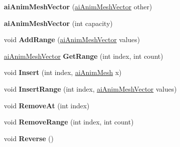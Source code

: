 \begin{DoxyCompactItemize}
\item 
\hypertarget{classai_anim_mesh_vector_a2f81b99181a5c1469b086d97b07157bb}{{\bfseries ai\+Anim\+Mesh\+Vector} (\hyperlink{classai_anim_mesh_vector}{ai\+Anim\+Mesh\+Vector} other)}\label{classai_anim_mesh_vector_a2f81b99181a5c1469b086d97b07157bb}

\item 
\hypertarget{classai_anim_mesh_vector_ad7437909a67f6fd1daba45ce2792d29b}{{\bfseries ai\+Anim\+Mesh\+Vector} (int capacity)}\label{classai_anim_mesh_vector_ad7437909a67f6fd1daba45ce2792d29b}

\item 
\hypertarget{classai_anim_mesh_vector_a24bf5932e8a6d019c3e59d7251af1abb}{void {\bfseries Add\+Range} (\hyperlink{classai_anim_mesh_vector}{ai\+Anim\+Mesh\+Vector} values)}\label{classai_anim_mesh_vector_a24bf5932e8a6d019c3e59d7251af1abb}

\item 
\hypertarget{classai_anim_mesh_vector_aa5515c3028c415d106d14c1f8a2b8ae2}{\hyperlink{classai_anim_mesh_vector}{ai\+Anim\+Mesh\+Vector} {\bfseries Get\+Range} (int index, int count)}\label{classai_anim_mesh_vector_aa5515c3028c415d106d14c1f8a2b8ae2}

\item 
\hypertarget{classai_anim_mesh_vector_a4df22a3f2be3208cc969376fa1addeb3}{void {\bfseries Insert} (int index, \hyperlink{structai_anim_mesh}{ai\+Anim\+Mesh} x)}\label{classai_anim_mesh_vector_a4df22a3f2be3208cc969376fa1addeb3}

\item 
\hypertarget{classai_anim_mesh_vector_a21f6607763567e5f4f2402b53683e9ba}{void {\bfseries Insert\+Range} (int index, \hyperlink{classai_anim_mesh_vector}{ai\+Anim\+Mesh\+Vector} values)}\label{classai_anim_mesh_vector_a21f6607763567e5f4f2402b53683e9ba}

\item 
\hypertarget{classai_anim_mesh_vector_a668f3a47215a4dbcf0b4ff4b2820d817}{void {\bfseries Remove\+At} (int index)}\label{classai_anim_mesh_vector_a668f3a47215a4dbcf0b4ff4b2820d817}

\item 
\hypertarget{classai_anim_mesh_vector_ad68797324b90f69c4fdf67c0f418cf22}{void {\bfseries Remove\+Range} (int index, int count)}\label{classai_anim_mesh_vector_ad68797324b90f69c4fdf67c0f418cf22}

\item 
\hypertarget{classai_anim_mesh_vector_a9a70f9b470532f2dc7f2cda419d425f6}{void {\bfseries Reverse} ()}\label{classai_anim_mesh_vector_a9a70f9b470532f2dc7f2cda419d425f6}


\end{DoxyCompactItemize}
